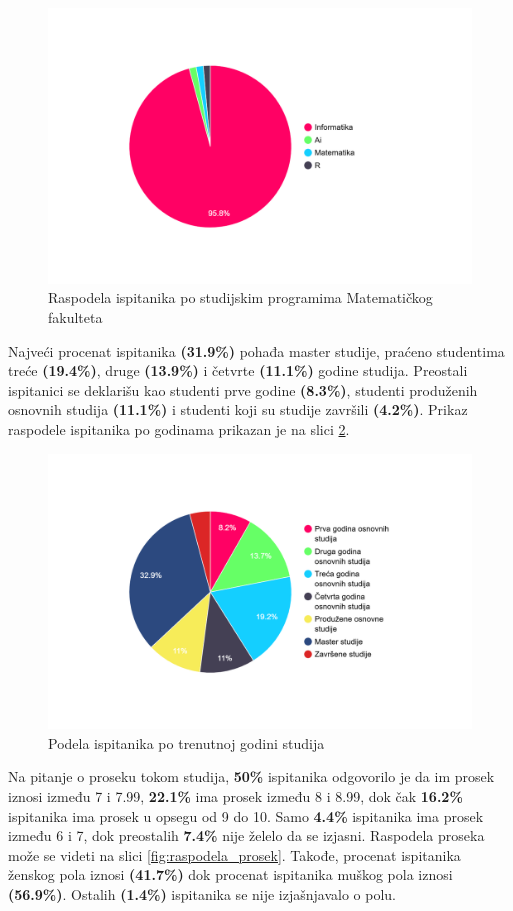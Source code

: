 \documentclass[a4paper]{article}
\begin{document}
{\begin{figure}[H]
    \centering
    \includegraphics[width=0.7\linewidth]{Slike/PieChartSmerovi.png}
    \caption{Raspodela ispitanika po studijskim programima Matematičkog fakulteta}
    \label{fig:raspodela_smerovi}
\end{figure}


Najveći procenat ispitanika \textbf{(31.9\%)} pohađa master studije, praćeno studentima treće \textbf{(19.4\%)}, druge \textbf{(13.9\%)} i četvrte \textbf{(11.1\%)} godine studija. Preostali ispitanici se deklarišu kao studenti prve godine \textbf{(8.3\%)}, studenti produženih osnovnih studija \textbf{(11.1\%)} i studenti koji su studije završili \textbf{(4.2\%)}. Prikaz raspodele ispitanika po godinama prikazan je na slici \ref{fig:raspodela_godine}.

\begin{figure}[H]
    \centering
    \includegraphics[width=0.7\linewidth]{Slike/PieChartGodinaStudiranja.png}
    \caption{Podela ispitanika po trenutnoj godini studija}
    \label{fig:raspodela_godine}
\end{figure}


Na pitanje o proseku tokom studija, \textbf{50\%} ispitanika odgovorilo je da im prosek iznosi između 7 i 7.99, \textbf{22.1\%} ima prosek između 8 i 8.99, dok čak \textbf{16.2\%} ispitanika ima prosek u opsegu od 9 do 10. Samo \textbf{4.4\%} ispitanika ima prosek između 6 i 7, dok preostalih \textbf{7.4\%} nije želelo da se izjasni. Raspodela proseka može se videti na slici \ref{fig:raspodela_prosek}. Takođe, procenat ispitanika ženskog pola iznosi \textbf{(41.7\%)} dok procenat ispitanika muškog pola iznosi \textbf{(56.9\%)}. Ostalih \textbf{(1.4\%)} ispitanika se nije izjašnjavalo o polu.

}
\end{document}
